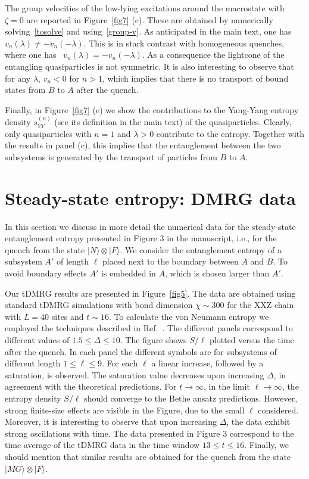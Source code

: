 \documentclass[twocolumn,superscriptaddress,prb,10pt]{revtex4-1}
\begin{document}
The group velocities of the low-lying excitations around the macrostate with $\zeta=0$ 
are reported in Figure~\ref{fig7} (c). These are obtained by numerically 
solving~\eqref{tosolve} and using~\eqref{group-v}. As anticipated in 
the main text, one has $v_n(\lambda)\ne-v_n(-\lambda)$. This is in stark contrast with 
homogeneous quenches, where one has~\cite{alba-2016} $v_n(\lambda)=-v_n(-\lambda)$. 
As a consequence the lightcone of the entangling quasiparticles is not 
symmetric. It is also interesting to observe that for any 
$\lambda$, $v_n<0$ for $n>1$, which implies that there is no transport of bound 
states from $B$ to $A$ after the quench.  

Finally, in Figure~\ref{fig7} (e) we show the contributions to the Yang-Yang 
entropy density $s_{YY}^{\scriptscriptstyle(n)}$ (see its definition in the main 
text) of the quasiparticles. Clearly, 
only quasiparticles with $n=1$ and $\lambda>0$ contribute to the entropy. Together with 
the results in panel (c), this implies that the entanglement between the two subsystems 
is generated by the transport of particles from $B$ to $A$. 

\section{Steady-state entropy: DMRG data} 
\label{tdmrg}

In this section we discuss in more detail the numerical data for the steady-state 
entanglement entropy presented in Figure $3$ in the manuscript, i.e., for the quench from the state 
$|N\rangle\otimes|F\rangle$. We consider the entanglement entropy of a subsystem $A'$ of 
length $\ell$ placed next to the boundary between $A$ and $B$. To avoid boundary effects $A'$ 
is embedded in $A$, which is chosen larger than $A'$. 

Our tDMRG results are presented in Figure~\ref{fig5}. The data are obtained using standard 
tDMRG simulations with bond dimension $\chi\sim 300$ for the XXZ chain with $L=40$ sites 
and $t\sim 16$. To calculate the von Neumann entropy we employed the techniques 
described in Ref.~. 
The different panels correspond to different values of $1.5\le\Delta\le 10$. The figure 
shows $S/\ell$ plotted versus the time after the quench. In each panel the different 
symbols are for subsystems of different length $1\le \ell\le 9$. For each $\ell$ a linear 
increase, followed by a saturation, is observed. The saturation value decreases upon increasing  
$\Delta$, in agreement with the theoretical predictions. 
For $t\to\infty$, in the limit $\ell\to\infty$, the entropy density $S/\ell$ should 
converge to the Bethe ansatz predictions. However, strong finite-size 
effects are visible in the Figure, due to the small $\ell$ considered. Moreover, it is interesting 
to observe that upon increasing $\Delta$, the data exhibit strong oscillations with time. 
The data presented in Figure $3$ correspond to the time average of the tDMRG data 
in the time window $13\le t\le 16$. Finally, we should mention that similar results are obtained 
for the quench from the state $|MG\rangle\otimes|F\rangle$.  
\end{document}
